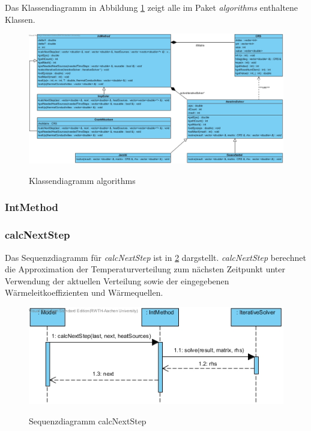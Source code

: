 Das Klassendiagramm in Abbildung \ref{Klassendiagramm algorithms} zeigt alle im Paket \emph{algorithms} enthaltene Klassen.

\begin{figure}[H]
	\centering
	\includegraphics[scale=.52]{Bilder/algorithms.jpg}\\
	\caption{Klassendiagramm algorithms}
	\label{Klassendiagramm algorithms}
\end{figure}

\subsubsection{IntMethod}

\subsubsection*{calcNextStep}

Das Sequenzdiagramm für \emph{calcNextStep} ist in \ref{Sequenzdiagramm calcNextStep} dargstellt. \emph{calcNextStep} berechnet die Approximation der Temperaturverteilung zum nächsten Zeitpunkt unter Verwendung der aktuellen Verteilung sowie der eingegebenen Wärmeleitkoeffizienten und Wärmequellen.

\begin{figure}[H]
	\centering
	\includegraphics[scale=.6]{Bilder/IntMethod__calcNextStep().jpg}\\
	\caption{Sequenzdiagramm calcNextStep}
	\label{Sequenzdiagramm calcNextStep}
\end{figure}

